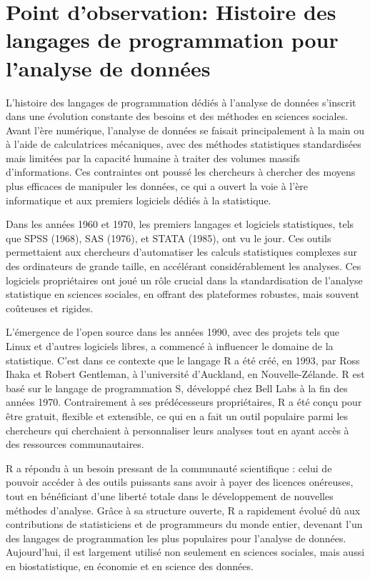 \documentclass[
  letterpaper,
  DIV=11,
  numbers=noendperiod]{scrreprt}
\begin{document}
\section{Point d'observation: Histoire des langages de programmation
pour l'analyse de
données}\label{point-dobservation-histoire-des-langages-de-programmation-pour-lanalyse-de-donnuxe9es}

L'histoire des langages de programmation dédiés à l'analyse de données
s'inscrit dans une évolution constante des besoins et des méthodes en
sciences sociales. Avant l'ère numérique, l'analyse de données se
faisait principalement à la main ou à l'aide de calculatrices
mécaniques, avec des méthodes statistiques standardisées mais limitées
par la capacité humaine à traiter des volumes massifs d'informations.
Ces contraintes ont poussé les chercheurs à chercher des moyens plus
efficaces de manipuler les données, ce qui a ouvert la voie à l'ère
informatique et aux premiers logiciels dédiés à la statistique.

Dans les années 1960 et 1970, les premiers langages et logiciels
statistiques, tels que SPSS (1968), SAS (1976), et STATA (1985), ont vu
le jour. Ces outils permettaient aux chercheurs d'automatiser les
calculs statistiques complexes sur des ordinateurs de grande taille, en
accélérant considérablement les analyses. Ces logiciels propriétaires
ont joué un rôle crucial dans la standardisation de l'analyse
statistique en sciences sociales, en offrant des plateformes robustes,
mais souvent coûteuses et rigides.

L'émergence de l'open source dans les années 1990, avec des projets tels
que Linux et d'autres logiciels libres, a commencé à influencer le
domaine de la statistique. C'est dans ce contexte que le langage R a été
créé, en 1993, par Ross Ihaka et Robert Gentleman, à l'université
d'Auckland, en Nouvelle-Zélande. R est basé sur le langage de
programmation S, développé chez Bell Labs à la fin des années 1970.
Contrairement à ses prédécesseurs propriétaires, R a été conçu pour être
gratuit, flexible et extensible, ce qui en a fait un outil populaire
parmi les chercheurs qui cherchaient à personnaliser leurs analyses tout
en ayant accès à des ressources communautaires.

R a répondu à un besoin pressant de la communauté scientifique : celui
de pouvoir accéder à des outils puissants sans avoir à payer des
licences onéreuses, tout en bénéficiant d'une liberté totale dans le
développement de nouvelles méthodes d'analyse. Grâce à sa structure
ouverte, R a rapidement évolué dû aux contributions de statisticiens et
de programmeurs du monde entier, devenant l'un des langages de
programmation les plus populaires pour l'analyse de données.
Aujourd'hui, il est largement utilisé non seulement en sciences
sociales, mais aussi en biostatistique, en économie et en science des
données.
\end{document}

